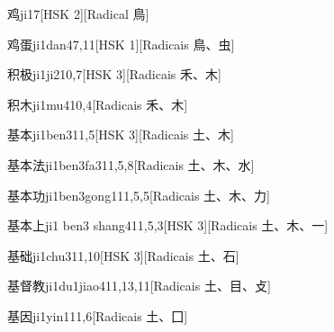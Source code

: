 \begin{entry}{鸡}{ji1}{7}[HSK 2][Radical ⿃]
\end{entry}

\begin{entry}{鸡蛋}{ji1dan4}{7,11}[HSK 1][Radicais ⿃、⾍]
\end{entry}

\begin{entry}{积极}{ji1ji2}{10,7}[HSK 3][Radicais ⽲、⽊]
\end{entry}

\begin{entry}{积木}{ji1mu4}{10,4}[Radicais ⽲、⽊]
\end{entry}

\begin{entry}{基本}{ji1ben3}{11,5}[HSK 3][Radicais ⼟、⽊]
\end{entry}

\begin{entry}{基本法}{ji1ben3fa3}{11,5,8}[Radicais ⼟、⽊、⽔]
\end{entry}

\begin{entry}{基本功}{ji1ben3gong1}{11,5,5}[Radicais ⼟、⽊、⼒]
\end{entry}

\begin{entry}{基本上}{ji1 ben3 shang4}{11,5,3}[HSK 3][Radicais ⼟、⽊、⼀]
\end{entry}

\begin{entry}{基础}{ji1chu3}{11,10}[HSK 3][Radicais ⼟、⽯]
\end{entry}

\begin{entry}{基督教}{ji1du1jiao4}{11,13,11}[Radicais ⼟、⽬、⽁]
\end{entry}

\begin{entry}{基因}{ji1yin1}{11,6}[Radicais ⼟、⼞]
\end{entry}

